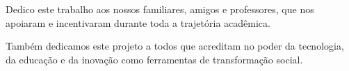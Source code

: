 \begin{dedicatoria}
	\vspace*{\fill}
    
    \center
    \begin{flushright}
    Dedico este trabalho aos nossos familiares, amigos e professores, que nos apoiaram e incentivaram durante toda a trajetória acadêmica.

    Também dedicamos este projeto a todos que acreditam no poder da tecnologia, da educação e da inovação como ferramentas de transformação social.    \end{flushright}
    
\end{dedicatoria}